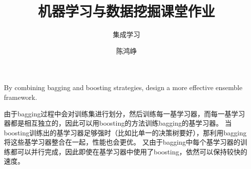 \documentclass[logo,reportComp]{thesis}
\title{机器学习与数据挖掘课堂作业}
\subtitle{集成学习}
\author{陈鸿峥}
\begin{document}
\maketitle

\begin{question}
\normalfont By combining bagging and boosting strategies, design a more effective ensemble framework.
\end{question}
\begin{answer}
由于bagging过程中会对训练集进行划分，然后训练每一基学习器，而每一基学习器都是相互独立的，因此可以用boosting的方法训练bagging的基学习器。
当boosting训练出的基学习器足够强时（比如比单一的决策树要好），那利用bagging将这些基学习器整合在一起，性能也会更优。
又由于bagging中每个基学习器的训练都可以并行完成，因此即使在基学习器中使用了boosting，依然可以保持较快的速度。
\end{answer}
\end{document}

